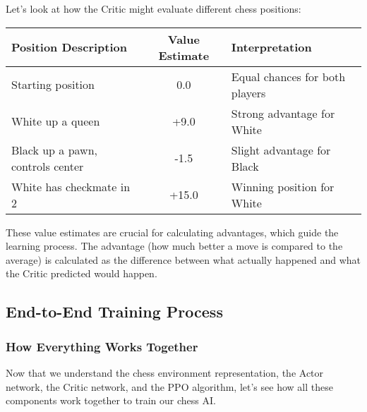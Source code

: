 \documentclass[11pt]{article}
\begin{document}
Let's look at how the Critic might evaluate different chess positions:

\begin{center}
\begin{tabular}{|p{4cm}|c|p{5cm}|}
\hline
\textbf{Position Description} & \textbf{Value Estimate} & \textbf{Interpretation} \\
\hline
 Starting position & 0.0 & Equal chances for both players \\
\hline
 White up a queen & +9.0 & Strong advantage for White \\
\hline
 Black up a pawn, controls center & -1.5 & Slight advantage for Black \\
\hline
 White has checkmate in 2 & +15.0 & Winning position for White \\
\hline
\end{tabular}
\end{center}

These value estimates are crucial for calculating advantages, which guide the learning process. The advantage (how much better a move is compared to the average) is calculated as the difference between what actually happened and what the Critic predicted would happen.

\subsection{End-to-End Training Process}

\subsubsection{How Everything Works Together}

Now that we understand the chess environment representation, the Actor network, the Critic network, and the PPO algorithm, let's see how all these components work together to train our chess AI.
\end{document}
